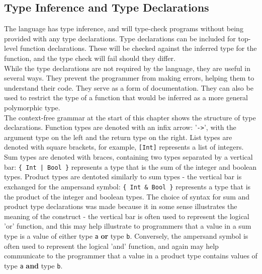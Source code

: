 \documentclass{article}
\begin{document}
\subsection{Type Inference and Type Declarations}
The language has type inference, and will type-check programs without being provided with any type declarations. Type declarations can be included for top-level function declarations. These will be checked against the inferred type for the function, and the type check will fail should they differ.
\\\indent While the type declarations are not required by the language, they are useful in several ways. They prevent the programmer from making errors, helping them to understand their code. They serve as a form of documentation. They can also be used to restrict the type of a function that would be inferred as a more general polymorphic type.
\\\indent The context-free grammar at the start of this chapter shows the structure of type declarations. Function types are denoted with an infix arrow: '\texttt{->}', with the argument type on the left and the return type on the right. List types are denoted with square brackets, for example, \texttt{[Int]} represents a list of integers. Sum types are denoted with braces, containing two types separated by a vertical bar: \texttt{\{ Int | Bool \}} represents a type that is the sum of the integer and boolean types. Product types are dentoted similarly to sum types - the vertical bar is exchanged for the ampersand symbol: \texttt{\{ Int \& Bool \}} represents a type that is the product of the integer and boolean types. The choice of syntax for sum and product type declarations was made because it in some sense illustrates the meaning of the construct - the vertical bar is often used to represent the logical 'or' function, and this may help illustrate to programmers that a value in a sum type is a value of either type \texttt{a} \textbf{or} type \texttt{b}. Conversely, the ampersand symbol is often used to represent the logical 'and' function, and again may help communicate to the programmer that a value in a product type contains values of type \texttt{a} \textbf{and} type \texttt{b}.
\end{document}

